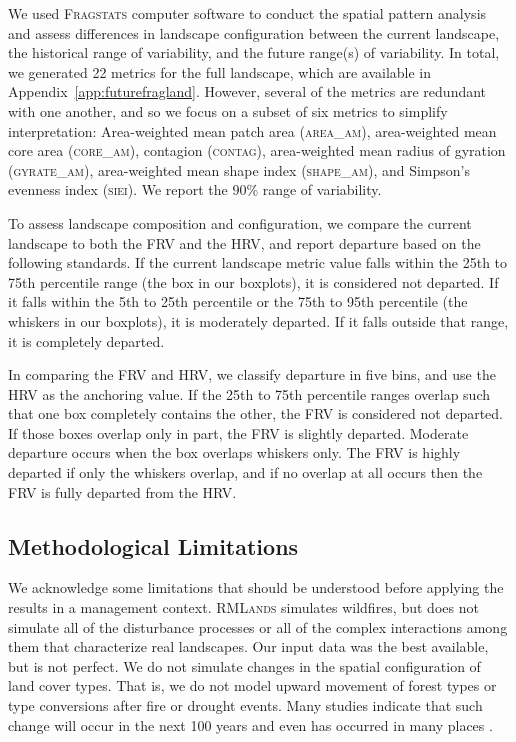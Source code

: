 \documentclass[12pt]{article}
\begin{document}
\begin{spacing}{1}
%
We used \textsc{Fragstats} computer software \citep{Fragstats2012} to conduct the spatial pattern analysis and assess differences in landscape configuration between the current landscape, the historical range of variability, and the future range(s) of variability. In total, we generated 22 metrics for the full landscape, which are available in Appendix~\ref{app:futurefragland}.  However, several of the metrics are redundant with one another, and so we focus on a subset of six metrics to simplify interpretation: Area-weighted mean patch area (\textsc{area\_am}), area-weighted mean core area (\textsc{core\_am}), contagion (\textsc{contag}), area-weighted mean radius of gyration (\textsc{gyrate\_am}), area-weighted mean shape index (\textsc{shape\_am}), and Simpson's evenness index (\textsc{siei}). We report the 90\% range of variability. %

To assess landscape composition and configuration, we compare the current landscape to both the FRV and the HRV, and report departure based on the following standards. If the current landscape metric value falls within the 25th to 75th percentile range (the box in our boxplots), it is considered not departed. If it falls within the 5th to 25th percentile or the 75th to 95th percentile (the whiskers in our boxplots), it is moderately departed. If it falls outside that range, it is completely departed.

In comparing the FRV and HRV, we classify departure in five bins, and use the HRV as the anchoring value. If the 25th to 75th percentile ranges overlap such that one box completely contains the other, the FRV is considered not departed. If those boxes overlap only in part, the FRV is slightly departed. Moderate departure occurs when the box overlaps whiskers only. The FRV is highly departed if only the whiskers overlap, and if no overlap at all occurs then the FRV is fully departed from the HRV.


\subsection*{Methodological Limitations}
We acknowledge some limitations that should be understood before applying the results in a management context. \textsc{RMLands} simulates wildfires, but does not simulate all of the disturbance processes or all of the complex interactions among them that characterize real landscapes. Our input data was the best available, but is not perfect. We do not simulate changes in the spatial configuration of land cover types. That is, we do not model upward movement of forest types or type conversions after fire or drought events. Many studies indicate that such change will occur in the next 100 years and even has occurred in many places \citep{Bachelet2001}. 


\end{spacing}
\end{document}
